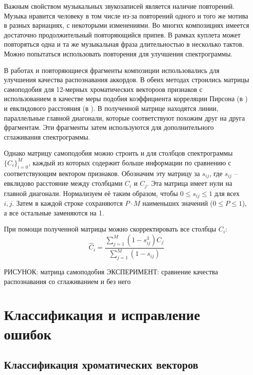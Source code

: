 Важным свойством музыкальных звукозаписей является наличие повторений. Музыка
нравится человеку в том числе из-за повторений одного и того же мотива в разных
вариациях, с некоторыми изменениями. Во многих композициях имеется достаточно
продолжительный повторяющийся припев. В рамках куплета может повторяться одна и
та же музыкальная фраза длительностью в несколько тактов. Можно попытаться
использовать повторения для улучшения спектрограммы.

В работах \cite{Mauch2010} и \cite{Cho2011} повторяющиеся фрагменты композиции
использовались для улучшения качества распознавания аккордов. В обеих методах
строились матрицы самоподобия для 12-мерных хроматических вектороов признаков с
использованием в качестве меры подобия коэффициента корреляции Пирсона (в
\cite{Mauch2010}) и евклидового расстояния (в \cite{Cho2011}). В полученной
матрице находятся линии, параллельные главной диагонали, которые соответствуют
похожим друг на друга фрагментам. Эти фрагменты затем используются для
дополнительного сглаживания спектрограммы.

Однако матрицу самоподобия можно строить и для столбцов спектрограммы
$\{C_i\}_{i=0}^M$, каждый из которых содержит больше информации по сравнению с
соответствующим вектором признаков. Обозначим эту матрицу за ${s_{ij}}$, где
$s_{ij}$ -- евклидово расстояние между столбцами $C_i$ и $C_j$. Эта матрица
имеет нули на главной диагонали. Нормализуем её таким образом, чтобы $0 \leq
s_{ij} \leq 1$ для всех $i, j$. Затем в каждой строке сохраняются $P \cdot M$
наименьших значений ($0 \leq P \leq 1$), а все остальные заменяются на 1.

При помощи полученной матрицы можно скорректировать все столбцы $C_i$:
$$
\widehat{C}_i = \frac{\sum\limits_{j=1}^M (1 - s_{ij}^3)
C_j}{\sum\limits_{j=1}^M (1 - s_{ij})} $$

РИСУНОК: матрица самоподобия
ЭКСПЕРИМЕНТ: сравнение качества распознавания со сглаживанием и без него


\section{Классификация и исправление ошибок} \label{sect1_class}

\subsection{Классификация хроматических векторов} \label{ssect1_chroma}

